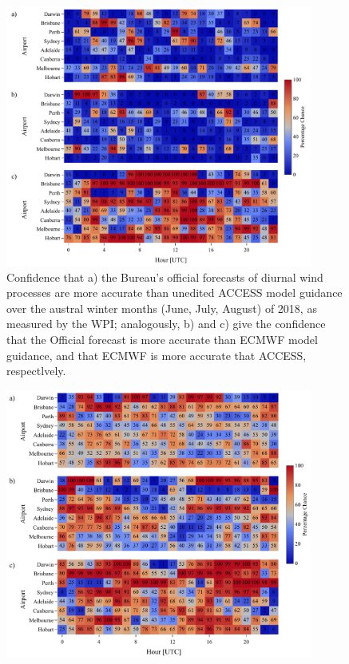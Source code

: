 \documentclass[alpha-refs]{wiley-article}
\begin{document}
\begin{figure}
\centering
\includegraphics[keepaspectratio=true,width=0.90\textwidth]{airport_wpi_winter.pdf}
\caption{Confidence that a) the Bureau's official forecasts of diurnal wind processes are more accurate than unedited ACCESS model guidance over the austral winter months (June, July, August) of 2018, as measured by the WPI; analogously, b) and c) give the confidence that the Official forecast is more accurate than ECMWF model guidance, and that ECMWF is more accurate that ACCESS, respectlvely. }
\label{Fig:airport_wpi_access}
\end{figure}

\begin{figure}
\centering
\includegraphics[keepaspectratio=true,width=0.90\textwidth]{airport_cwpi_winter.pdf}
\label{Fig:airport_cwpi_access}
\end{figure}
\end{document}
